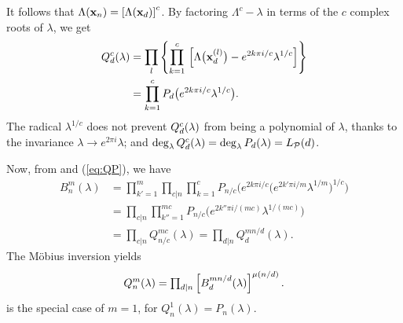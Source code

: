 \documentclass{ws-ijbc}
\begin{document}
%
It follows that
$\Lambda(\mathbf{x}_{n}) = \left[ \Lambda(\mathbf{x}_{d}) \right]^c$.
%
By factoring $\Lambda^c - \lambda$
  in terms of the $c$ complex roots of $\lambda$,
  we get
%
\begin{align}
Q_d^{c}(\lambda)
  &=
    \prod_l
    \left\{
      \prod_{k=1}^c \,
      \left[
          \Lambda\big(\mathbf{x}_{d}^{(l)}\big)
          -
          e^{2k\pi i/c} \lambda^{1/c}
      \right]
    \right\}
    \notag \\
  &=  \prod_{k=1}^c P_d\big(e^{2k\pi i/c} \lambda^{1/c}\big).
\label{eq:QP}
\end{align}
%
%
The radical $\lambda^{1/c}$
  does not prevent
  $Q_d^c(\lambda)$ from being a polynomial of $\lambda$,
  thanks to the invariance
  $\lambda \rightarrow e^{2\pi i} \lambda$;
and
  $\deg_\lambda Q_d^c(\lambda)
    = \deg_\lambda P_d(\lambda) = L_\mathcal P(d)$.






Now, from  and (\ref{eq:QP}), we have
\begin{align*}
 B_n^m (\lambda)
 & = \prod_{k' = 1}^m \prod_{c | n} \prod_{k=1}^c
      P_{n/c}\Big(
        e^{2k\pi i/c}
        \big(
          e^{2 k' \pi i/m} \lambda^{1/m}
        \big)^{1/c}
      \Big) \\
 & = \prod_{c | n} \prod_{k''=1}^{m c}
    P_{n/c}\big(
      e^{2k''\pi i/(m c)} \lambda^{1/(m c)}
      \big) \\
 &
  = \prod_{c | n} Q_{n/c}^{m c}(\lambda)
  = \prod_{d | n} Q_{d}^{m n/d}(\lambda).
\end{align*}
The M\"obius inversion yields
\begin{equation}
Q_n^m(\lambda)
= \textstyle\prod_{d|n}
  \left[
    B_d^{m n/d}(\lambda)
  \right]^{\mu(n/d)}.
\notag
\end{equation}
 is the special case of $m = 1$,
for $Q_n^1(\lambda) = P_n(\lambda)$.
\end{document}
